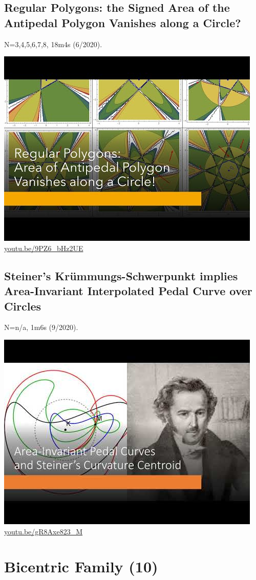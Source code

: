 \documentclass[12pt]{amsart}
\begin{document}
\subsection{Regular Polygons: the Signed Area of the Antipedal Polygon Vanishes along a Circle?}
\label{vid:9PZ6_bHz2UE}
\noindent N=3,4,5,6,7,8, 18m4s (6/2020). 
\begin{center}\includegraphics[width=.5\textwidth]{pics/9PZ6_bHz2UE.jpg} \\ 
\href{https://youtu.be/9PZ6_bHz2UE}{\url{youtu.be/9PZ6\_bHz2UE}}\end{center}
% 
\subsection{Steiner's Krümmungs-Schwerpunkt implies Area-Invariant Interpolated Pedal Curve over Circles}
\label{vid:gR8Axe823_M}
\noindent N=n/a, 1m6s (9/2020). 
\begin{center}\includegraphics[width=.5\textwidth]{pics/gR8Axe823_M.jpg} \\ 
\href{https://youtu.be/gR8Axe823_M}{\url{youtu.be/gR8Axe823\_M}}\end{center}
% 

\section{Bicentric Family (10)}
\end{document}
